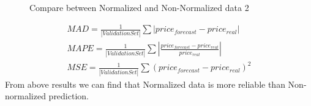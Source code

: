 \documentclass[12pt,a4paper]{scrartcl}
\begin{document}
	\begin{figure}[ht]
		\centering
		\caption{Compare between Normalized and Non-Normalized data 2}
		\label{fig:mse_mad}
	\end{figure}
	\begin{gather}
	\label{eq:MAD}
	MAD = \frac{1}{|ValidationSet|}\sum|price_{forecast}-price_{real}|\\
	\label{eq:MAPE}
	MAPE = \frac{1}{|ValidationSet|}\sum|\frac{price_{forecast}-price_{real}}{price_{real}}|\\
	\label{eq:MSE}
	MSE = \frac{1}{|ValidationSet|}\sum(price_{forecast}-price_{real})^2
	\end{gather}
	From above results we can find that Normalized data is more reliable than Non-normalized prediction.
\end{document}
